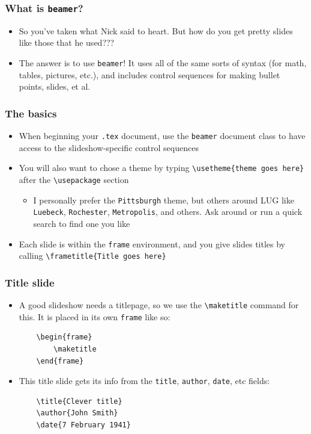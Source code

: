 \documentclass{beamer}
\begin{document}
\begin{frame}
\frametitle{What is \texttt{beamer}?}
\begin{itemize}
    \item So you've taken what Nick said to heart. But how do you get pretty slides like those that he used???
    \pause
    \item The answer is to use \texttt{beamer}! It uses all of the same sorts of syntax (for math, tables, pictures, etc.), and includes control
sequences for making bullet points, slides, et al.
\end{itemize}
\end{frame}

\begin{frame}[fragile]
\frametitle{The basics}
\begin{itemize}
    \item When beginning your \texttt{.tex} document, use the \texttt{beamer} document class to have access to the slideshow-specific control sequences
    \pause
    \item You will also want to chose a theme by typing \verb+\usetheme{theme goes here}+ after the \verb+\usepackage+ section
    \begin{itemize}
        \item I personally prefer the \texttt{Pittsburgh} theme, but others around LUG like \texttt{Luebeck}, \texttt{Rochester}, \texttt{Metropolis}, and others. Ask around or run a quick search to find one you like
    \end{itemize}
    \pause
    \item Each slide is within the \texttt{frame} environment, and you give slides titles by calling \verb+\frametitle{Title goes here}+
\end{itemize}
\end{frame}

\begin{frame}[fragile]
\frametitle{Title slide}
\begin{itemize}
    \item A good slideshow needs a titlepage, so we use the \verb+\maketitle+ command for this. It is placed in its own \texttt{frame} like so:
    \begin{lstlisting}
    \begin{frame}
        \maketitle
    \end{frame}
    \end{lstlisting}
    \pause
    \item This title slide gets its info from the \texttt{title}, \texttt{author}, \texttt{date}, etc fields:
    \begin{lstlisting}
    \title{Clever title}
    \author{John Smith}
    \date{7 February 1941}
    \end{lstlisting} %
\end{itemize}
\end{frame}
\end{document}
